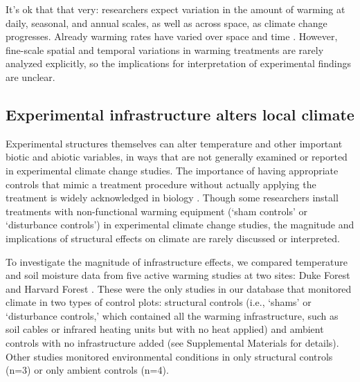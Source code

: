 \documentclass{article}
\begin{document}
\par %
It's ok that that very: researchers expect variation in the amount of warming at daily, seasonal, and annual scales, as well as across space, as climate change progresses. Already warming rates have varied over space and time \citep{ipcc2013}. However, fine-scale spatial and temporal variations in warming treatments are rarely analyzed explicitly, so the implications for interpretation of experimental findings are unclear. %

\subsection* {Experimental infrastructure alters local climate}
Experimental structures themselves can alter temperature and other important biotic and abiotic variables, in ways that are not generally examined or reported in experimental climate change studies. The importance of having appropriate controls that mimic a treatment procedure without actually applying the treatment is widely acknowledged in biology \citep[e.g.,][]{spector2001,johnson2002,quinn2002}. Though some researchers install treatments with non-functional warming equipment (`sham controls' or `disturbance controls') in experimental climate change studies, the magnitude and implications of structural effects on climate are rarely discussed or interpreted.
\par To investigate the magnitude of infrastructure effects, we compared temperature and soil moisture data from five active warming studies at two sites: Duke Forest and Harvard Forest \citep{farnsworth1995,clark2014a, marchin2015, pelini2011}. These were the only studies in our database that monitored climate in two types of control plots: structural controls (i.e., `shams' or `disturbance controls,' which contained all the warming infrastructure, such as soil cables or infrared heating units but with no heat applied) and ambient controls with no infrastructure added (see Supplemental Materials for details). Other studies monitored environmental conditions in only structural controls (n=3) or only ambient controls (n=4).
\end{document}
